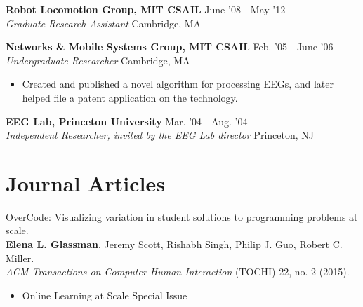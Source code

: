 \documentclass[margin]{res}
\begin{document}
\begin{resume}
{\bf Robot Locomotion Group, MIT CSAIL} \hfill June '08 - May '12 \\  {\it Graduate Research Assistant} \hfill Cambridge, MA 
 
% 
{\bf Networks \& Mobile Systems Group, MIT CSAIL} \hfill Feb. '05 - June '06 \\{\it Undergraduate Researcher}  \hfill Cambridge, MA 
 \begin{itemize} \itemsep -2pt  %
\item Created and published a novel algorithm for processing EEGs, and later helped file a patent application on the technology.
\end{itemize}


{\bf EEG Lab, Princeton University} \hfill Mar. '04 - Aug. '04 \\ {\it Independent Researcher, invited by the EEG Lab director} \hfill Princeton, NJ 
 
 
\section{Journal Articles}

OverCode: Visualizing variation in student solutions to programming problems at scale.\\
{\bf Elena L. Glassman}, Jeremy Scott, Rishabh Singh, Philip J. Guo, Robert C. Miller. \\ 
{\it ACM Transactions on Computer-Human Interaction} (TOCHI) 22, no. 2 (2015).
\begin{itemize} \itemsep -2pt 
\item Online Learning at Scale Special Issue
\end{itemize}


\end{resume}
\end{document}
